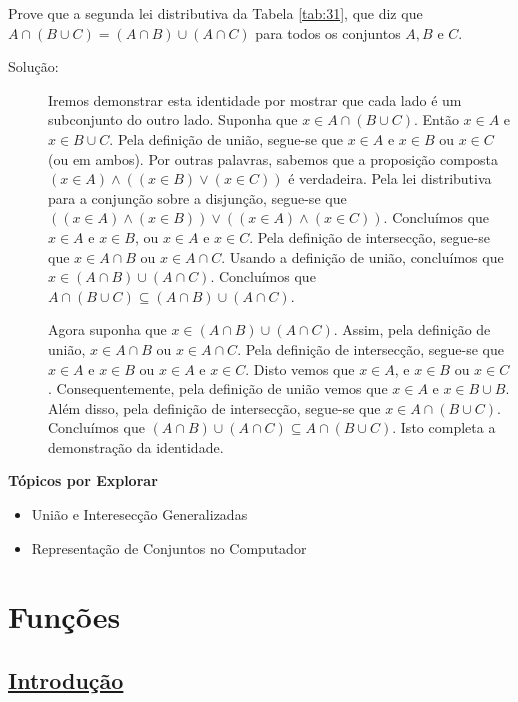 \begin{exmp}
\label{exem327}
Prove que a segunda lei distributiva da Tabela \ref{tab:31}, que diz que $A
\cap (B \cup C) = (A \cap B) \cup (A \cap C)$ para todos os conjuntos $A, B$ e
$C$.

\begin{description}
\item[Solução:] Iremos demonstrar esta identidade por mostrar que cada lado é um
subconjunto do outro lado. Suponha que $x \in A \cap (B \cup C)$. Então $x \in
A$ e $x \in B \cup C$. Pela definição de união, segue-se que $x \in A$ e $x \in
B$ ou $x \in C$ (ou em ambos). Por outras palavras, sabemos que a proposição
composta $(x \in A) \land ((x \in B) \lor (x \in C))$ é verdadeira. Pela lei
distributiva para a conjunção sobre a disjunção, segue-se que $((x \in A)
\land (x \in B)) \lor ((x \in A) \land (x \in C))$. Concluímos que $x \in A$ e
$x \in B$, ou $x \in A$ e $x \in C$. Pela definição de intersecção, segue-se que
$x \in A \cap B$ ou $x \in A \cap C$. Usando a definição de união, concluímos
que $x \in (A \cap B) \cup (A \cap C)$. Concluímos que $A \cap (B \cup C)
\subseteq (A \cap B) \cup (A \cap C)$.

Agora suponha que $x \in (A \cap B) \cup (A \cap C)$. Assim, pela definição de
união, $x \in A \cap B$ ou $x \in A \cap C$. Pela definição de intersecção,
segue-se que $x \in A$ e $x \in B$ ou $x \in A$ e $x \in C$. Disto vemos que $x
\in A$, e $x \in B$ ou $x \in C$. Consequentemente, pela definição de união
vemos que $x \in A$ e $x \in B \cup B$. Além disso, pela definição de
intersecção, segue-se que $x \in A \cap (B \cup C)$. Concluímos que $(A \cap B)
\cup (A \cap C) \subseteq A \cap (B \cup C)$. Isto completa a demonstração da
identidade.
\end{description}
\end{exmp}


{
\textbf{Tópicos por Explorar}
\begin{itemize}
  \item União e Interesecção Generalizadas
  \item Representação de Conjuntos no Computador
\end{itemize}
}

\section{Funções}
\subsection*{\underline{Introdução}}

